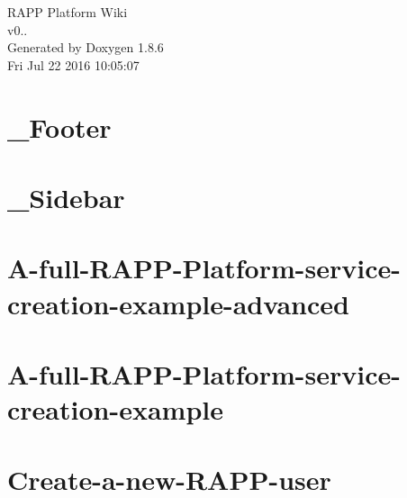 \documentclass[twoside]{book}
\newcommand{\clearemptydoublepage}{%
  \newpage{\pagestyle{empty}\cleardoublepage}%
}
\begin{document}
\hypersetup{pageanchor=false}
\begin{titlepage}
\vspace*{7cm}
\begin{center}%
{\Large R\-A\-P\-P Platform Wiki \\[1ex]\large v0.. }\\
\vspace*{1cm}
{\large Generated by Doxygen 1.8.6}\\
\vspace*{0.5cm}
{\small Fri Jul 22 2016 10:05:07}\\
\end{center}
\end{titlepage}
\clearemptydoublepage
\tableofcontents
\clearemptydoublepage
{}
\hypersetup{pageanchor=true}

\chapter{\-\_\-\-Footer}
\label{md_rapp-platform_8wiki__Footer}
\hypertarget{md_rapp-platform_8wiki__Footer}{}

\chapter{\-\_\-\-Sidebar}
\label{md_rapp-platform_8wiki__Sidebar}
\hypertarget{md_rapp-platform_8wiki__Sidebar}{}

\chapter{A-\/full-\/\-R\-A\-P\-P-\/\-Platform-\/service-\/creation-\/example-\/advanced}
\label{md_rapp-platform_8wiki_A-full-RAPP-Platform-service-creation-example-advanced}
\hypertarget{md_rapp-platform_8wiki_A-full-RAPP-Platform-service-creation-example-advanced}{}

\chapter{A-\/full-\/\-R\-A\-P\-P-\/\-Platform-\/service-\/creation-\/example}
\label{md_rapp-platform_8wiki_A-full-RAPP-Platform-service-creation-example}
\hypertarget{md_rapp-platform_8wiki_A-full-RAPP-Platform-service-creation-example}{}

\chapter{Create-\/a-\/new-\/\-R\-A\-P\-P-\/user}
\label{md_rapp-platform_8wiki_Create-a-new-RAPP-user}
\hypertarget{md_rapp-platform_8wiki_Create-a-new-RAPP-user}{}

\end{document}
